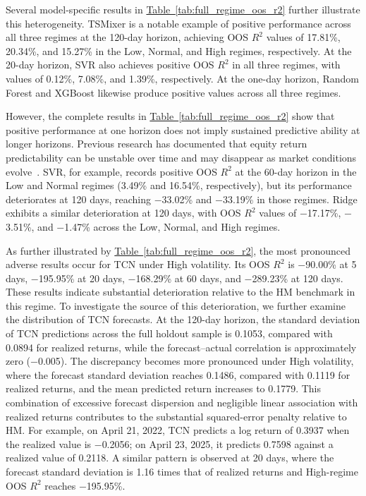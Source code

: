 \documentclass[runningheads,orivec]{llncs}
\begin{document}
Several model-specific results in \hyperref[tab:full_regime_oos_r2]{Table~\ref*{tab:full_regime_oos_r2}} further illustrate this heterogeneity. TSMixer is a notable example of positive performance across all three regimes at the 120-day horizon, achieving OOS $R^2$ values of 17.81\%, 20.34\%, and 15.27\% in the Low, Normal, and High regimes, respectively. At the 20-day horizon, SVR also achieves positive OOS $R^2$ in all three regimes, with values of 0.12\%, 7.08\%, and 1.39\%, respectively. At the one-day horizon, Random Forest and XGBoost likewise produce positive values across all three regimes.

However, the complete results in \hyperref[tab:full_regime_oos_r2]{Table~\ref*{tab:full_regime_oos_r2}} show that positive performance at one horizon does not imply sustained predictive ability at longer horizons. Previous research has documented that equity return predictability can be unstable over time and may disappear as market conditions evolve~\cite{harvey2021,paye2006}. SVR, for example, records positive OOS $R^2$ at the 60-day horizon in the Low and Normal regimes (3.49\% and 16.54\%, respectively), but its performance deteriorates at 120 days, reaching $-$33.02\% and $-$33.19\% in those regimes. Ridge exhibits a similar deterioration at 120 days, with OOS $R^2$ values of $-$17.17\%, $-$3.51\%, and $-$1.47\% across the Low, Normal, and High regimes.

As further illustrated by \hyperref[tab:full_regime_oos_r2]{Table~\ref*{tab:full_regime_oos_r2}}, the most pronounced adverse results occur for TCN under High volatility. Its OOS $R^2$ is $-$90.00\% at 5 days, $-$195.95\% at 20 days, $-$168.29\% at 60 days, and $-$289.23\% at 120 days. These results indicate substantial deterioration relative to the HM benchmark in this regime. To investigate the source of this deterioration, we further examine the distribution of TCN forecasts. At the 120-day horizon, the standard deviation of TCN predictions across the full holdout sample is 0.1053, compared with 0.0894 for realized returns, while the forecast--actual correlation is approximately zero ($-$0.005). The discrepancy becomes more pronounced under High volatility, where the forecast standard deviation reaches 0.1486, compared with 0.1119 for realized returns, and the mean predicted return increases to 0.1779. This combination of excessive forecast dispersion and negligible linear association with realized returns contributes to the substantial squared-error penalty relative to HM. For example, on April 21, 2022, TCN predicts a log return of 0.3937 when the realized value is $-$0.2056; on April 23, 2025, it predicts 0.7598 against a realized value of 0.2118. A similar pattern is observed at 20 days, where the forecast standard deviation is 1.16 times that of realized returns and High-regime OOS $R^2$ reaches $-$195.95\%.
\end{document}
